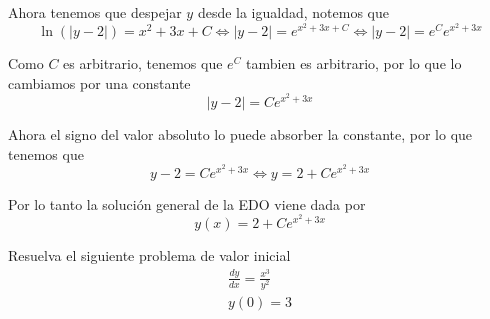 \documentclass[a4paper,oneside,10.5pt]{article}
\begin{document}
\begin{sol}
  Ahora tenemos que despejar $y$ desde la igualdad, notemos que
  \begin{equation*}
    \ln(|y - 2|) = x^{2} + 3x + C \iff |y - 2| = e^{x^{2} + 3x + C} \iff |y - 2| = e^{C}e^{x^{2} + 3x}
  \end{equation*}

  Como $C$ es arbitrario, tenemos que $e^{C}$ tambien es arbitrario, por lo que lo cambiamos por una constante
  \begin{equation*}
    |y - 2| = Ce^{x^{2} + 3x}
  \end{equation*}

  Ahora el signo del valor absoluto lo puede absorber la constante, por lo que tenemos que
  \begin{equation*}
    y - 2 = Ce^{x^{2} + 3x} \iff y = 2 + Ce^{x^{2} + 3x}
  \end{equation*}

  Por lo tanto la soluci\'on general de la EDO viene dada por
  \begin{equation*}
    y(x) = 2 + Ce^{x^{2} + 3x}
  \end{equation*}
\end{sol}

\begin{prob}
  Resuelva el siguiente problema de valor inicial
  \begin{gather*}
    \frac{dy}{dx} = \frac{x^{3}}{y^{2}}\\
    y(0) = 3
  \end{gather*}
\end{prob}
\end{document}
